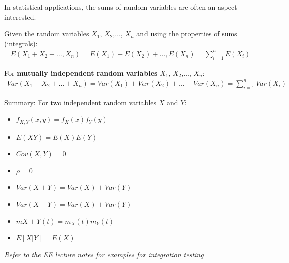 \documentclass[10pt,a4paper]{article}
\begin{document}
In statistical applications, the sums of random variables are often an aspect interested.

Given the random variables $X_1$, $X_2$,$\dots$, $X_n$ and using the properties of sums (integrals):
\begin{align*}
    E(X_1 + X_2 +\dots, X_n) = E(X_1) + E(X_2) + \dots, E(X_n) = \sum^n_{i=1} E(X_i)
\end{align*}

For \textbf{mutually independent random variables} $X_1$, $X_2$,$\dots$, $X_n$:
\begin{align*}
    Var(X_1 + X_2 +\dots+ X_n) = Var(X_1) + Var(X_2) + \dots + Var(X_n) = \sum_{i=1}^n Var(X_i)
\end{align*}

\begin{tcolorbox}[breakable,colback=white]
    Summary: For two independent random variables $X$ and $Y$:
    \begin{itemize}
        \item $f_{X,Y} (x, y) = f_X (x) f_Y (y)$
        \item $E(XY ) = E(X) E(Y)$
        \item $Cov(X, Y) = 0$
        \item $\rho = 0$
        \item $Var(X + Y ) = Var(X) + Var(Y )$
        \item $Var(X - Y ) = Var(X) + Var(Y )$
        \item $m{X+Y} (t) = m_X(t)m_Y(t)$
        \item $E[X|Y] = E(X)$
    \end{itemize}
\end{tcolorbox}

\begin{center}
    \textit{Refer to the EE lecture notes for examples for integration testing}
\end{center}




\end{document}

